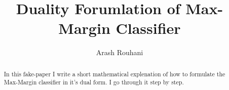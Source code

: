 \documentclass[a4paper,11pt]{article}
\title{Duality Forumlation of Max-Margin Classifier}
\author{Arash Rouhani}
\begin{document}
\maketitle
\tableofcontents

\begin{abstract}
In this fake-paper I write a short mathematical explenation
of how to formulate the Max-Margin classifier in it's dual form.
I go through it step by step.

\end{abstract}

\section{}
\end{document}
